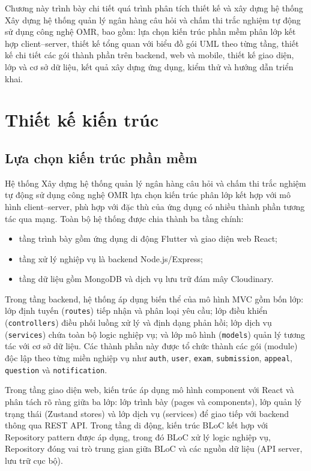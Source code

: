 ﻿\documentclass[../DoAn.tex]{subfiles}
\begin{document}
Chương này trình bày chi tiết quá trình phân tích thiết kế và xây dựng hệ thống Xây dựng hệ thống quản lý ngân hàng câu hỏi và chấm thi trắc nghiệm tự động sử dụng công nghệ OMR, bao gồm: lựa chọn kiến trúc phần mềm phân lớp kết hợp client--server, thiết kế tổng quan với biểu đồ gói UML theo từng tầng, thiết kế chi tiết các gói thành phần trên backend, web và mobile, thiết kế giao diện, lớp và cơ sở dữ liệu, kết quả xây dựng ứng dụng, kiểm thử và hướng dẫn triển khai.

\section{Thiết kế kiến trúc}
\label{section:4.1}

\subsection{Lựa chọn kiến trúc phần mềm}
\label{subsection:4.1.1}

Hệ thống Xây dựng hệ thống quản lý ngân hàng câu hỏi và chấm thi trắc nghiệm tự động sử dụng công nghệ OMR lựa chọn kiến trúc phân lớp kết hợp với mô hình client--server, phù hợp với đặc thù của ứng dụng có nhiều thành phần tương tác qua mạng. Toàn bộ hệ thống được chia thành ba tầng chính:
\begin{itemize}
    \item tầng trình bày gồm ứng dụng di động Flutter và giao diện web React;
    \item tầng xử lý nghiệp vụ là backend Node.js/Express;
    \item tầng dữ liệu gồm MongoDB và dịch vụ lưu trữ đám mây Cloudinary.
\end{itemize}

Trong tầng backend, hệ thống áp dụng biến thể của mô hình MVC gồm bốn lớp: lớp định tuyến (\texttt{routes}) tiếp nhận và phân loại yêu cầu; lớp điều khiển (\texttt{controllers}) điều phối luồng xử lý và định dạng phản hồi; lớp dịch vụ (\texttt{services}) chứa toàn bộ logic nghiệp vụ; và lớp mô hình (\texttt{models}) quản lý tương tác với cơ sở dữ liệu. Các thành phần này được tổ chức thành các gói (module) độc lập theo từng miền nghiệp vụ như \texttt{auth}, \texttt{user}, \texttt{exam}, \texttt{submission}, \texttt{appeal}, \texttt{question} và \texttt{notification}.

Trong tầng giao diện web, kiến trúc áp dụng mô hình component với React và phân tách rõ ràng giữa ba lớp: lớp trình bày (pages và components), lớp quản lý trạng thái (Zustand stores) và lớp dịch vụ (services) để giao tiếp với backend thông qua REST API. Trong tầng di động, kiến trúc BLoC kết hợp với Repository pattern được áp dụng, trong đó BLoC xử lý logic nghiệp vụ, Repository đóng vai trò trung gian giữa BLoC và các nguồn dữ liệu (API server, lưu trữ cục bộ).
\end{document}
